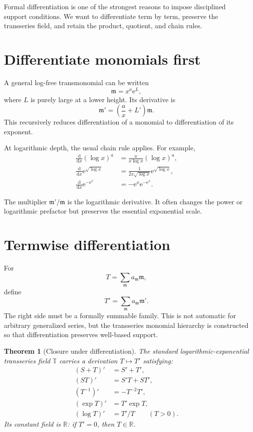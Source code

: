 \documentclass[11pt,openany]{book}
\theoremstyle{definition}
\theoremstyle{plain}
\newtheorem{theorem}{Theorem}[chapter]
\theoremstyle{remark}
\newcommand{\R}{\mathbb{R}}
\newcommand{\T}{\mathbb{T}}
\newcommand{\m}{\mathfrak{m}}
\newcommand{\dd}{\,\mathrm{d}}
\newcommand{\e}{\mathrm{e}}
\begin{document}
Formal differentiation is one of the strongest reasons to impose disciplined support conditions. We want to differentiate term by term, preserve the transseries field, and retain the product, quotient, and chain rules.

\section{Differentiate monomials first}

A general log-free transmonomial can be written
\[
 \m=x^a\e^L,
\]
where $L$ is purely large at a lower height. Its derivative is
\begin{equation}\label{eq:monomial-derivative}
 \m'=\left(\frac{a}{x}+L'\right)\m.
\end{equation}
This recursively reduces differentiation of a monomial to differentiation of its exponent.

At logarithmic depth, the usual chain rule applies. For example,
\begin{align*}
 \frac{\dd}{\dd x}(\log x)^a
 &=\frac{a}{x\log x}(\log x)^a,\\
 \frac{\dd}{\dd x}\e^{\sqrt{\log x}}
 &=\frac{1}{2x\sqrt{\log x}}\e^{\sqrt{\log x}},\\
 \frac{\dd}{\dd x}\e^{-\e^x}
 &=-\e^x\e^{-\e^x}.
\end{align*}

The multiplier $\m'/\m$ is the logarithmic derivative. It often changes the power or logarithmic prefactor but preserves the essential exponential scale.

\section{Termwise differentiation}

For
\[
 T=\sum_{\m}a_{\m}\m,
\]
define
\begin{equation}\label{eq:termwise-derivative}
 T'=\sum_{\m}a_{\m}\m'.
\end{equation}
The right side must be a formally summable family. This is not automatic for arbitrary generalized series, but the transseries monomial hierarchy is constructed so that differentiation preserves well-based support.

\begin{theorem}[Closure under differentiation]\label{thm:diff-closure}
The standard logarithmic-exponential transseries field $\T$ carries a derivation $T\mapsto T'$ satisfying:
\begin{align*}
 (S+T)'&=S'+T',\\
 (ST)'&=S'T+ST',\\
 (T^{-1})'&=-T^{-2}T',\\
 (\exp T)'&=T'\exp T,\\
 (\log T)'&=T'/T\qquad(T>0).
\end{align*}
Its constant field is $\R$: if $T'=0$, then $T\in\R$.
\end{theorem}
\end{document}
